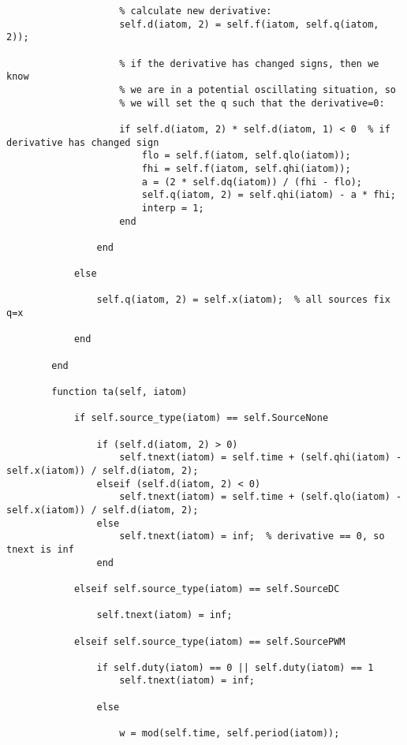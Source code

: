 \begin{lstlisting}
                    % calculate new derivative:
                    self.d(iatom, 2) = self.f(iatom, self.q(iatom, 2));

                    % if the derivative has changed signs, then we know 
                    % we are in a potential oscillating situation, so
                    % we will set the q such that the derivative=0:

                    if self.d(iatom, 2) * self.d(iatom, 1) < 0  % if derivative has changed sign
                        flo = self.f(iatom, self.qlo(iatom)); 
                        fhi = self.f(iatom, self.qhi(iatom));
                        a = (2 * self.dq(iatom)) / (fhi - flo);
                        self.q(iatom, 2) = self.qhi(iatom) - a * fhi;
                        interp = 1;
                    end

                end
                
            else
                
                self.q(iatom, 2) = self.x(iatom);  % all sources fix q=x
                
            end
            
        end
        
        function ta(self, iatom)
            
            if self.source_type(iatom) == self.SourceNone
                
                if (self.d(iatom, 2) > 0)
                    self.tnext(iatom) = self.time + (self.qhi(iatom) - self.x(iatom)) / self.d(iatom, 2);
                elseif (self.d(iatom, 2) < 0)
                    self.tnext(iatom) = self.time + (self.qlo(iatom) - self.x(iatom)) / self.d(iatom, 2);
                else
                    self.tnext(iatom) = inf;  % derivative == 0, so tnext is inf
                end
             
            elseif self.source_type(iatom) == self.SourceDC
                
                self.tnext(iatom) = inf;
                
            elseif self.source_type(iatom) == self.SourcePWM
                
                if self.duty(iatom) == 0 || self.duty(iatom) == 1
                    self.tnext(iatom) = inf;
                    
                else

                    w = mod(self.time, self.period(iatom));


\end{lstlisting}
